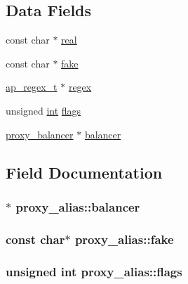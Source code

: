 \subsection*{Data Fields}
\begin{DoxyCompactItemize}
\item 
const char $\ast$ \hyperlink{structproxy__alias_a62e250f96fd9f5756c85c3df047282c7}{real}
\item 
const char $\ast$ \hyperlink{structproxy__alias_ae4561a39b8d452bd0cb2e9616ac5a29a}{fake}
\item 
\hyperlink{structap__regex__t}{ap\+\_\+regex\+\_\+t} $\ast$ \hyperlink{structproxy__alias_aed6c1229f88d2b5260bd257307f06585}{regex}
\item 
unsigned \hyperlink{pcre_8txt_a42dfa4ff673c82d8efe7144098fbc198}{int} \hyperlink{structproxy__alias_adfa719d5e167e58b058fafac671d985d}{flags}
\item 
\hyperlink{structproxy__balancer}{proxy\+\_\+balancer} $\ast$ \hyperlink{structproxy__alias_a1d7f5e6a304640efb8d4fb0d33be9d08}{balancer}
\end{DoxyCompactItemize}


\subsection{Field Documentation}
\subsubsection[{\texorpdfstring{balancer}{balancer}}]{$\ast$ proxy\+\_\+alias\+::balancer}\hypertarget{structproxy__alias_a1d7f5e6a304640efb8d4fb0d33be9d08}{}\label{structproxy__alias_a1d7f5e6a304640efb8d4fb0d33be9d08}
\subsubsection[{\texorpdfstring{fake}{fake}}]{\setlength{\rightskip}{0pt plus 5cm}const char$\ast$ proxy\+\_\+alias\+::fake}\hypertarget{structproxy__alias_ae4561a39b8d452bd0cb2e9616ac5a29a}{}\label{structproxy__alias_ae4561a39b8d452bd0cb2e9616ac5a29a}
\subsubsection[{\texorpdfstring{flags}{flags}}]{\setlength{\rightskip}{0pt plus 5cm}unsigned {\bf int} proxy\+\_\+alias\+::flags}\hypertarget{structproxy__alias_adfa719d5e167e58b058fafac671d985d}{}\label{structproxy__alias_adfa719d5e167e58b058fafac671d985d}
